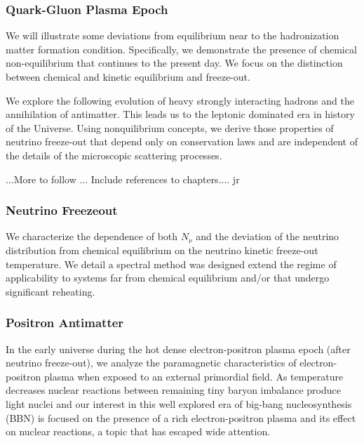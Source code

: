 \subsubsection{Quark-Gluon Plasma Epoch}
\label{sec:qgpOverview}

We will illustrate some deviations from equilibrium near to the hadronization matter formation condition. Specifically, we demonstrate the presence of chemical non-equilibrium that continues to the present day. We focus on the distinction between chemical and kinetic equilibrium and freeze-out.

We explore the following evolution of heavy strongly interacting hadrons and the annihilation of antimatter. This leads us to the leptonic dominated era in history of the Universe. Using nonquilibrium concepts, we derive those properties of neutrino freeze-out that depend only on conservation laws and are independent of the details of the microscopic scattering processes. 


...More to follow ... Include references to chapters.... jr
 

\subsubsection{Neutrino Freezeout}
\label{ssec:nuoverview}
We characterize the dependence of both $N_\nu$ and the deviation of the neutrino distribution from chemical equilibrium on the neutrino kinetic freeze-out temperature. We detail a spectral method was designed extend the regime of applicability to systems far from chemical equilibrium and/or that undergo significant reheating.

\subsubsection{Positron Antimatter}
\label{ssec:PositronView}
In the early universe during the hot dense electron-positron plasma epoch (after neutrino freeze-out), we analyze the paramagnetic characteristics of electron-positron plasma when exposed to an external primordial field. As temperature decreases nuclear reactions between remaining tiny baryon imbalance produce light nuclei and our interest in this well explored era of big-bang nucleosynthesis (BBN) is focused on the presence of a rich electron-positron plasma and its effect on nuclear reactions, a topic that has escaped wide attention.

